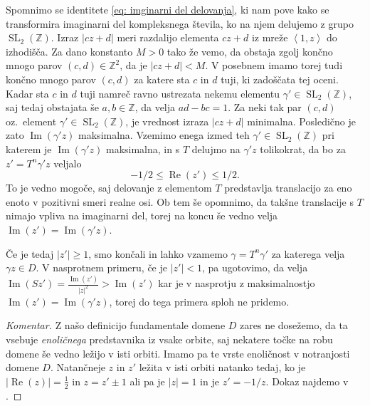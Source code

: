 \documentclass[mat1]{fmfdelo}
\numberwithin{equation}{section}
\newcommand{\Z}{\mathbb Z}
\newcommand{\SL}{\operatorname{SL}_2(\Z)}
\newcommand{\abs}[1]{\left\lvert #1 \right\rvert}
\newcommand{\lattice}[2]{\left\langle #1, #2 \right\rangle}
\renewcommand\Re{\operatorname{Re}}%
\renewcommand\Im{\operatorname{Im}}%
\newcommand{\oz}{oz.\ }
\theoremstyle{definition}
\newenvironment{komentar}[1][Komentar]{\begin{proof}[#1]\let\qed\relax}{\end{proof}}
\begin{document}
\begin{dokaz}
    Spomnimo se identitete \eqref{eq: imginarni del delovanja}, ki nam pove kako se transformira imaginarni del kompleksnega števila, ko na njem delujemo z grupo $\SL$. Izraz $\abs{cz + d}$ meri razdalijo elementa $cz + d$ iz mreže $\lattice{1}{z}$ do izhodišča. Za dano konstanto $M > 0$ tako že vemo, da obstaja zgolj končno mnogo parov $(c,d) \in \Z^2$, da je $\abs{cz + d} < M$. V posebnem imamo torej tudi končno mnogo parov $(c,d)$ za katere sta $c$ in $d$ tuji, ki zadoščata tej oceni. Kadar sta $c$ in $d$ tuji namreč ravno ustrezata nekemu elementu $\gamma' \in \SL$, saj tedaj obstajata še $a,b \in \Z$, da velja $ad - bc = 1$. Za neki tak par $(c,d)$ \oz element $\gamma' \in \SL$, je vrednost izraza $\abs{cz + d}$ minimalna. Posledično je zato $\Im(\gamma' z)$ maksimalna.
    Vzemimo enega izmed teh $\gamma' \in \SL$ pri katerem je $\Im(\gamma'z)$ maksimalna, in s $T$ delujmo na $\gamma'z$ tolikokrat, da bo za $z' = T^n\gamma'z$ veljalo
    \[
        -1/2 \leq \Re(z') \leq 1/2.
    \]
    To je vedno mogoče, saj delovanje z elementom $T$ predstavlja translacijo za eno enoto v pozitivni smeri realne osi. Ob tem še opomnimo, da takšne translacije s $T$ nimajo vpliva na imaginarni del, torej na koncu še vedno velja $\Im(z') = \Im(\gamma'z)$. 

    Če je tedaj $\abs{z'} \geq 1$, smo končali in lahko vzamemo $\gamma = T^n\gamma'$ za katerega velja $\gamma z\in D$. V nasprotnem primeru, če je $\abs{z'} < 1$, pa ugotovimo, da velja $\Im(Sz') = \frac{\Im(z')}{\abs{z}^2} > \Im(z')$
    kar je v nasprotju z maksimalnostjo $\Im(z') = \Im(\gamma'z)$, torej do tega primera sploh ne pridemo.
\end{dokaz}


\begin{komentar}
    Z našo definicijo fundamentale domene $D$ zares ne dosežemo, da ta vsebuje \emph{enoličnega} predstavnika iz vsake orbite, saj nekatere točke na robu domene še vedno ležijo v isti orbiti. Imamo pa te vrste enoličnost v notranjosti domene $D$.
    Natančneje $z$ in $z'$ ležita v isti orbiti natanko tedaj, ko je $\abs{\Re(z)} = \frac12$ in $z = z' \pm 1$ ali pa je $\abs{z} = 1$ in je $z' = -1/z$. Dokaz najdemo v \cite[Izrek 1, VII, \S1]{Serre}.
\end{komentar}
\end{document}
